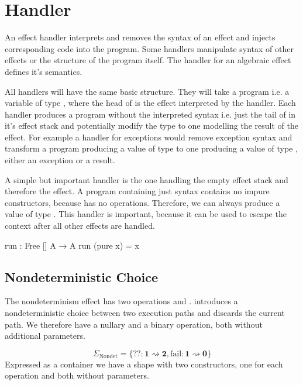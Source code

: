\section{Handler}

An effect handler interprets and removes the syntax of an effect and injects
corresponding code into the program.
Some handlers manipulate syntax of other effects or the structure of the program
itself.
The handler for an algebraic effect defines it's semantics.

All handlers will have the same basic structure.
They will take a program i.e. a variable of type
\AgdaSpace{}\AgdaSpace{}
, where the head of  is the effect interpreted by the handler.
Each handler produces a program without the interpreted syntax i.e. just the
tail of  in it's effect stack and potentially modify the type
 to one modelling the result of the effect.
For example a handler for exceptions would remove exception syntax and transform
a program producing a value of type  to one producing a value of
type \AgdaSpace{}\AgdaSpace{},
either an exception or a result.

A simple but important handler is the one handling the empty effect stack and
therefore the  effect.
A program containing just  syntax contains no impure
constructors, because  has no operations.
Therefore, we can always produce a value of type .
This handler is important, because it can be used to escape the
 context after all other effects are handled.

\begin{code}
run : Free [] A → A
run (pure x) = x
\end{code}

\subsection{Nondeterministic Choice}
\label{nondeterminism}

The nondeterminism effect has two operations  and
.
 introduces a nondeterministic choice between two execution
paths and  discards the current path.
We therefore have a nullary and a binary operation, both without additional
parameters.

$$
\Sigma_{\text{Nondet}} = \{ ?\!? : \mathbf{1} \rightsquigarrow \mathbf{2}, \mathrm{fail} : \mathbf{1} \rightsquigarrow \mathbf{0} \}
$$
Expressed as a container we have a shape with two constructors, one for each
operation and both without parameters.

